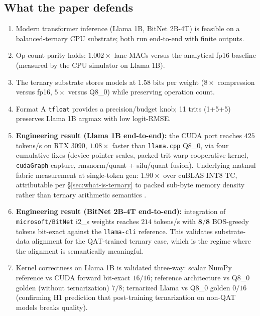 \documentclass{article}
\begin{document}
\subsection{What the paper defends}

\begin{enumerate}
  \item Modern transformer inference (Llama 1B, BitNet 2B-4T) is feasible
    on a balanced-ternary {CPU} substrate; both run end-to-end with finite
    outputs.
  \item Op-count parity holds: $1.002\times$ lane-{MAC}s versus the analytical
    fp16 baseline (measured by the {CPU} simulator on Llama 1B).
  \item The ternary substrate stores models at $1.58$ bits per weight
    ($8\times$ compression versus fp16, $5\times$ versus Q8\_0) while
    preserving operation count.
  \item Format A \texttt{tfloat} provides a precision/budget knob; 11
    trits (1+5+5) preserves Llama 1B argmax with low logit-{RMSE}.
  \item \textbf{Engineering result (Llama 1B end-to-end):} the {CUDA}
    port reaches $425$ tokens/s on {RTX 3090}, $1.08\times$ faster than
    \texttt{llama.cpp} {Q8\_0}, via four cumulative fixes (device-pointer
    scales, packed-trit warp-cooperative kernel, \texttt{cudaGraph}
    capture, rmsnorm/quant + silu/quant fusion). Underlying matmul
    fabric measurement at single-token gen: $1.90\times$ over cuBLAS
    {INT8} {TC}, attributable per \S\ref{sec:what-is-ternary} to packed
    sub-byte memory density rather than ternary arithmetic semantics
    \citep{cuevas-formal-2026}.
  \item \textbf{Engineering result (BitNet 2B-4T end-to-end):}
    integration of \texttt{microsoft/BitNet} i2\_s weights reaches
    $214$ tokens/s with $\mathbf{8/8}$ {BOS}-greedy tokens bit-exact
    against the \texttt{llama-cli} reference. This validates
    substrate-data alignment for the {QAT}-trained ternary case, which
    is the regime where the alignment is semantically meaningful.
  \item Kernel correctness on Llama 1B is validated three-way: scalar
    NumPy reference vs {CUDA} forward bit-exact $16/16$; reference
    architecture vs {Q8\_0} golden (without ternarization) $7/8$;
    ternarized Llama vs {Q8\_0} golden $0/16$ (confirming H1
    prediction that post-training ternarization on non-{QAT} models
    breaks quality).
\end{enumerate}
\end{document}
